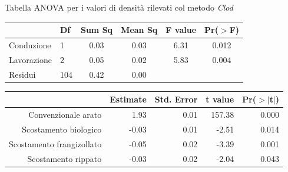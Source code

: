\documentclass[10pt]{beamer}
\begin{document}
\begin{frame}{Tabella ANOVA per i valori di densità rilevati col metodo \emph{Clod}}
  \begin{table}
    \centering
    \begin{tabular}{llcccc}
      \hline
      & Df & Sum Sq & Mean Sq & F value & Pr($>$F) \\ 
      \hline
      Conduzione & 1 & 0.03 & 0.03 & 6.31 & 0.012 \\ 
      Lavorazione & 2 & 0.05 & 0.02 & 5.83 & 0.004 \\ 
      Residui & 104 & 0.42 & 0.00 &  &  \\ 
      \hline
    \end{tabular}
    \label{tab:Anova densita per spinta}
  \end{table}
\end{frame}

\begin{frame}[label=summary]
\hyperlink{densita}{}
  \footnotesize
  \begin{table}[ht]
    \centering
    \begin{tabular}{rrrrr}
      \hline
      & Estimate & Std. Error & t value & Pr($>$$|$t$|$) \\ 
      \hline
      Convenzionale arato & 1.93 & 0.01 & 157.38 & 0.000 \\ 
      Scostamento biologico & -0.03 & 0.01 & -2.51 & 0.014 \\ 
      Scostamento frangizollato & -0.05 & 0.02 & -3.39 & 0.001 \\ 
      Scostamento rippato & -0.03 & 0.02 & -2.04 & 0.043 \\ 
      \hline
    \end{tabular}
    \label{tab:Riassunto densita spinta}
  \end{table}
\end{frame}
\end{document}

